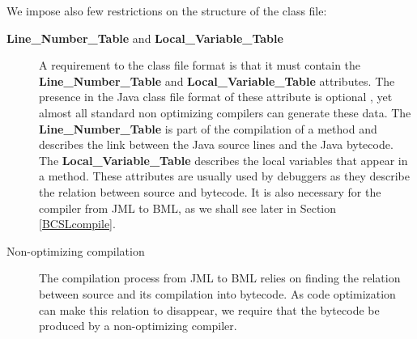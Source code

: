 \begin{description}
     
      
\end{description}



We impose also few restrictions on the structure of the class file:

\begin{description}
  \item [\textbf{Line\_Number\_Table} and \textbf{Local\_Variable\_Table}]
       A requirement to the class file format is that it must contain 
       the \textbf{Line\_Number\_Table} 
       and \textbf{Local\_Variable\_Table}  attributes. The presence in the Java class file format of 
       these attribute is optional \cite{VMSpec}, yet almost all standard non optimizing compilers can generate these data. 
       The \textbf{Line\_Number\_Table} is part of the compilation of a method and 
       describes the link between the Java source lines and the Java bytecode.
       The \textbf{Local\_Variable\_Table} describes the local variables that appear in a method.  
       These attributes are usually used by debuggers as they describe the relation between source and bytecode.
       It is also necessary for the compiler from JML to BML, as we shall see later in Section \ref{BCSLcompile}.

  \item [Non-optimizing compilation] 
       The compilation process from JML to BML relies on finding the relation between source and its compilation into bytecode.
       As code optimization can make this relation to disappear, we require that the bytecode be produced by a non-optimizing
       compiler.
\end{description}





